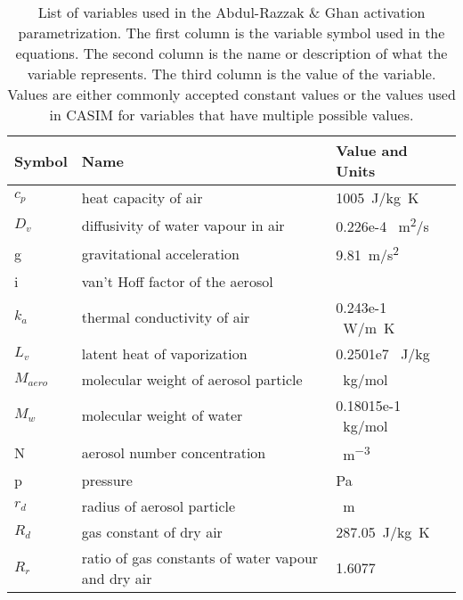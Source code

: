 \begin{table}[h]
	\centering
	\caption{List of variables used in the Abdul-Razzak \& Ghan activation parametrization. The first column is the variable symbol used in the equations. The second column is the name or description of what the variable represents. The third column is the value of the variable. Values are either commonly accepted constant values or the values used in CASIM for variables that have multiple possible values.}
	\label{tab:argVariables}
	\begin{tabular}{|l|l|l|}
		\hline
		\textbf{Symbol} & \textbf{Name}                                      & \textbf{Value and Units} \\ \hline
		$c_p$           & heat capacity of air                               & \SI{1005}{J/kg K}        \\ \hline		
		$D_v$           & diffusivity of water vapour in air                 & 0.226e-4 \SI{}{m^{2}/s}   \\ \hline
		g               & gravitational acceleration                         & \SI{9.81}{m/s^{2}}       \\ \hline
		i               & van't Hoff factor of the aerosol                   &                          \\ \hline
		$k_a$           & thermal conductivity of air                        & 0.243e-1 \SI{}{W/m K}     \\ \hline
		$L_v$           & latent heat of vaporization                        & 0.2501e7 \SI{}{J/kg}      \\ \hline
		$M_{aero}$      & molecular weight of aerosol particle               & \SI{}{kg/mol}            \\ \hline
		$M_w$           & molecular weight of water                          & 0.18015e-1 \SI{}{kg/mol}  \\ \hline
		N               & aerosol number concentration                       & \SI{}{m^{-3}}            \\ \hline
		p               & pressure                                           & Pa                       \\ \hline
		$r_d$           & radius of aerosol particle                         & \SI{}{m}                 \\ \hline
		$R_d$           & gas constant of dry air                            & \SI{287.05}{J/kg K}      \\ \hline
		$R_r$           & ratio of gas constants of water vapour and dry air & \SI{1.6077}{}            \\ \hline

\end{tabular}
\end{table}
